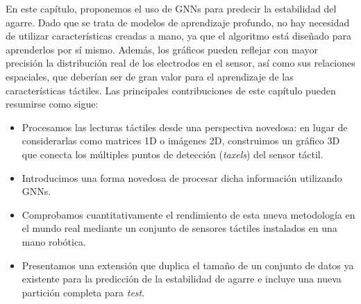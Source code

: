 En este capítulo, proponemos el uso de \acp{GNN} para predecir la estabilidad del agarre. Dado que se trata de modelos de aprendizaje profundo, no hay necesidad de utilizar características creadas a mano, ya que el algoritmo está diseñado para aprenderlos por sí mismo. Además, los gráficos pueden reflejar con mayor precisión la distribución real de los electrodos en el sensor, así como sus relaciones espaciales, que deberían ser de gran valor para el aprendizaje de las características táctiles. Las principales contribuciones de este capítulo pueden resumirse como sigue:

\begin{itemize}
	\item Procesamos las lecturas táctiles desde una perspectiva novedosa: en lugar de considerarlas como matrices 1D o imágenes 2D, construimos un gráfico 3D que conecta los múltiples puntos de detección (\emph{taxels}) del sensor táctil.

	\item Introducimos una forma novedosa de procesar dicha información utilizando \acfp{GNN}.

	\item Comprobamos cuantitativamente el rendimiento de esta nueva metodología en el mundo real mediante un conjunto de sensores táctiles instalados en una mano robótica.

	\item Presentamos una extensión que duplica el tamaño de un conjunto de datos ya existente \cite{Zapata2018} para la predicción de la estabilidad de agarre e incluye una nueva partición completa para \emph{test}.
\end{itemize}